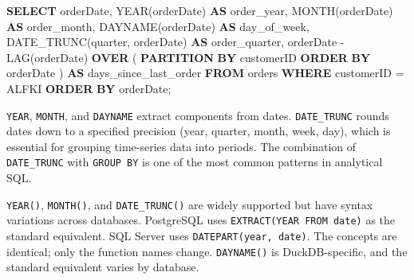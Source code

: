 \documentclass[
  letterpaper,
  DIV=11,
  numbers=noendperiod]{scrreprt}
\newenvironment{Shaded}{\begin{snugshade}}{\end{snugshade}}
\newcommand{\DataTypeTok}[1]{\textcolor[rgb]{0.68,0.00,0.00}{#1}}
\newcommand{\FunctionTok}[1]{\textcolor[rgb]{0.28,0.35,0.67}{#1}}
\newcommand{\KeywordTok}[1]{\textcolor[rgb]{0.00,0.23,0.31}{\textbf{#1}}}
\newcommand{\NormalTok}[1]{\textcolor[rgb]{0.00,0.23,0.31}{#1}}
\newcommand{\OperatorTok}[1]{\textcolor[rgb]{0.37,0.37,0.37}{#1}}
\newcommand{\StringTok}[1]{\textcolor[rgb]{0.13,0.47,0.30}{#1}}
\begin{document}
\begin{codelisting}

\caption{\texttt{duckdb}}

\begin{Shaded}
\begin{Highlighting}[]
\KeywordTok{SELECT}
\NormalTok{    orderDate,}
    \DataTypeTok{YEAR}\NormalTok{(orderDate) }\KeywordTok{AS}\NormalTok{ order\_year,}
    \DataTypeTok{MONTH}\NormalTok{(orderDate) }\KeywordTok{AS}\NormalTok{ order\_month,}
\NormalTok{    DAYNAME(orderDate) }\KeywordTok{AS}\NormalTok{ day\_of\_week,}
\NormalTok{    DATE\_TRUNC(}\StringTok{\textquotesingle{}quarter\textquotesingle{}}\NormalTok{, orderDate) }\KeywordTok{AS}\NormalTok{ order\_quarter,}
\NormalTok{    orderDate }\OperatorTok{{-}} \FunctionTok{LAG}\NormalTok{(orderDate) }\KeywordTok{OVER}\NormalTok{ (}
        \KeywordTok{PARTITION} \KeywordTok{BY}\NormalTok{ customerID }\KeywordTok{ORDER} \KeywordTok{BY}\NormalTok{ orderDate}
\NormalTok{    ) }\KeywordTok{AS}\NormalTok{ days\_since\_last\_order}
\KeywordTok{FROM}\NormalTok{ orders}
\KeywordTok{WHERE}\NormalTok{ customerID }\OperatorTok{=} \StringTok{\textquotesingle{}ALFKI\textquotesingle{}}
\KeywordTok{ORDER} \KeywordTok{BY}\NormalTok{ orderDate;}
\end{Highlighting}
\end{Shaded}

\end{codelisting}

\texttt{YEAR}, \texttt{MONTH}, and \texttt{DAYNAME} extract components
from dates. \texttt{DATE\_TRUNC} rounds dates down to a specified
precision (year, quarter, month, week, day), which is essential for
grouping time-series data into periods. The combination of
\texttt{DATE\_TRUNC} with \texttt{GROUP\ BY} is one of the most common
patterns in analytical SQL.

\begin{tcolorbox}[enhanced jigsaw, opacitybacktitle=0.6, arc=.35mm, colback=white, bottomtitle=1mm, opacityback=0, toprule=.15mm, left=2mm, colbacktitle=quarto-callout-note-color!10!white, breakable, coltitle=black, toptitle=1mm, colframe=quarto-callout-note-color-frame, bottomrule=.15mm, titlerule=0mm, title=\textcolor{quarto-callout-note-color}{\faInfo}\hspace{0.5em}{Date Function Portability}, rightrule=.15mm, leftrule=.75mm]

\texttt{YEAR()}, \texttt{MONTH()}, and \texttt{DATE\_TRUNC()} are widely
supported but have syntax variations across databases. PostgreSQL uses
\texttt{EXTRACT(YEAR\ FROM\ date)} as the standard equivalent. SQL
Server uses \texttt{DATEPART(year,\ date)}. The concepts are identical;
only the function names change. \texttt{DAYNAME()} is DuckDB-specific,
and the standard equivalent varies by database.

\end{tcolorbox}
\end{document}
